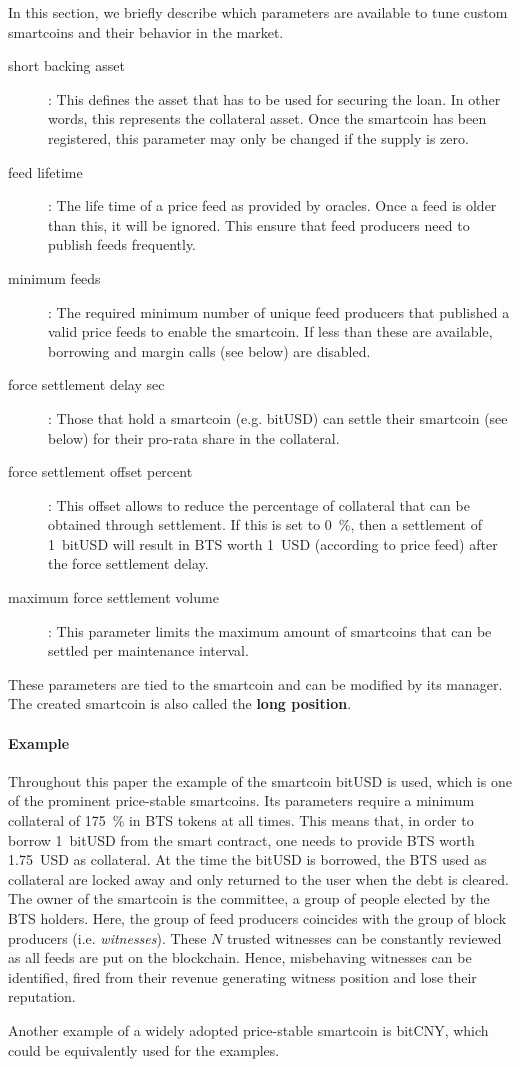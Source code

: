 In this section, we briefly describe which parameters are available to tune
custom smartcoins and their behavior in the market.

\begin{description}
 \item[short backing asset]: This defines the asset that has to be used for
       securing the loan. In other words, this represents the collateral asset.
       Once the smartcoin has been registered, this parameter may only be
       changed if the supply is zero.
 \item[feed lifetime]: The life time of a price feed as provided by oracles.
       Once a feed is older than this, it will be ignored. This ensure that
       feed producers need to publish feeds frequently.
 \item[minimum feeds]: The required minimum number of unique feed producers that
       published a valid price feeds to enable the smartcoin. If less than
       these are available, borrowing and margin calls (see below) are
       disabled.
 \item[force settlement delay sec]: Those that hold a smartcoin (e.g. bitUSD)
       can settle their smartcoin (see below) for their pro-rata share in the
       collateral.
 \item[force settlement offset percent]: This offset allows to reduce the
       percentage of collateral that can be obtained through settlement.
       If this is set to \SI{0}{\percent}, then a settlement of \SI{1}{bitUSD}
       will result in BTS worth \SI{1}{USD} (according to price feed) after the
       force settlement delay.
 \item[maximum force settlement volume]: This parameter limits the maximum
       amount of smartcoins that can be settled per maintenance interval.
\end{description}

These parameters are tied to the smartcoin and can be modified by its manager.
The created smartcoin is also called the \textbf{long position}.

\paragraph{Example}
Throughout this paper the example of the smartcoin bitUSD is used, which is one of
the prominent price-stable smartcoins. Its parameters require
a minimum collateral of \SI{175}{\percent} in BTS tokens at all times. This
means that, in order to borrow \SI{1}{bitUSD} from the smart contract, one
needs to provide BTS worth \SI{1.75}{USD} as collateral. At the time the bitUSD
is borrowed, the BTS used as collateral are locked away and only returned to
the user when the debt is cleared.
The owner of the smartcoin is the committee, a group of people elected by the BTS holders. Here, the
group of feed producers coincides with the group of block producers (i.e. \emph{witnesses}).
These $N$ trusted witnesses can be constantly reviewed as all feeds are put on
the blockchain. Hence, misbehaving witnesses can be identified, fired from
their revenue generating witness position and lose their reputation.

Another example of a widely adopted price-stable smartcoin is bitCNY, which could be equivalently used for 
the examples.
